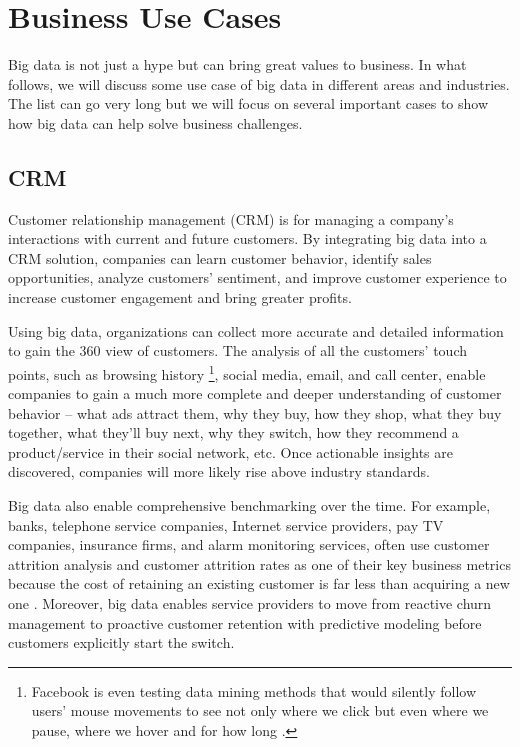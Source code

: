 \documentclass[12pt]{book}
\begin{document}
\section{Business Use Cases}

Big data is not just a hype but can bring great values to business. In what follows, we will discuss some use case of big data in different areas and industries. The list can go very long but we will focus on several important cases to show how big data can help solve business challenges.

\subsection{CRM}
Customer relationship management (CRM) is for managing a company's interactions with current and future customers. By integrating big data into a CRM solution, companies can learn customer behavior, identify sales opportunities, analyze customers' sentiment, and improve customer experience to increase customer engagement and bring greater profits.

Using big data, organizations can collect more accurate and detailed information to gain the 360 view of customers. The analysis of all the customers' touch points, such as browsing history \footnote{Facebook is even testing data mining methods that would silently follow users' mouse movements to see not only where we click but even where we pause, where we hover and for how long \cite{Facebook13Mouse}.}, social media, email, and call center, enable companies to gain a much more complete and deeper understanding of customer behavior -- what ads attract them, why they buy, how they shop, what they buy together, what they'll buy next, why they switch, how they recommend a product/service in their social network, etc. Once actionable insights are discovered, companies will more likely rise above industry standards.

Big data also enable comprehensive benchmarking over the time. For example, banks, telephone service companies, Internet service providers, pay TV companies, insurance firms, and alarm monitoring services, often use customer attrition analysis and customer attrition rates as one of their key business metrics because the cost of retaining an existing customer is far less than acquiring a new one \cite{ReichheldSasser1990}.
Moreover, big data enables service providers to move from reactive churn management to proactive customer retention with predictive modeling before customers explicitly start the switch.
\end{document}
